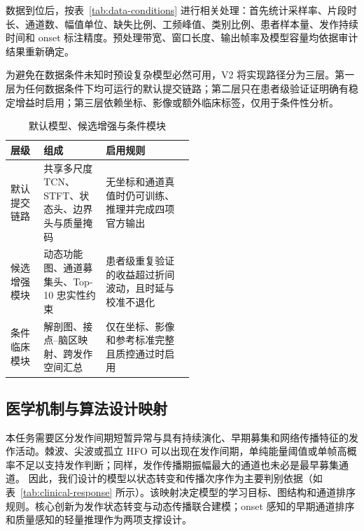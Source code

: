 \documentclass{cumcmthesis_v2}
\numberwithin{figure}{section} %
\numberwithin{table}{section} %
\begin{document}
数据到位后，按表~\ref{tab:data-conditions} 进行相关处理：首先统计采样率、片段时长、通道数、幅值单位、缺失比例、工频峰值、类别比例、患者样本量、发作持续时间和 onset 标注精度。预处理带宽、窗口长度、输出帧率及模型容量均依据审计结果重新确定。

为避免在数据条件未知时预设复杂模型必然可用，V2 将实现路径分为三层。第一层为任何数据条件下均可运行的默认提交链路；第二层只在患者级验证证明确有稳定增益时启用；第三层依赖坐标、影像或额外临床标签，仅用于条件性分析。

\begin{table}[htbp]
    \centering
    \small
    \caption{默认模型、候选增强与条件模块}
    \label{tab:model-levels}
    \renewcommand{\arraystretch}{1.25}
    \setlength{\tabcolsep}{4pt}
    \begin{tabularx}{\linewidth}{@{}p{0.18\linewidth}p{0.34\linewidth}X@{}}
        \toprule
        \textbf{层级} & \textbf{组成} & \textbf{启用规则} \\
        \midrule
        默认提交链路 & 共享多尺度 TCN、STFT、状态头、边界头与质量掩码 & 无坐标和通道真值时仍可训练、推理并完成四项官方输出 \\
        候选增强模块 & 动态功能图、通道募集头、Top-10 忠实性约束 & 患者级重复验证的收益超过折间波动，且时延与校准不退化 \\
        条件临床模块 & 解剖图、接点--脑区映射、跨发作空间汇总 & 仅在坐标、影像和参考标准完整且质控通过时启用 \\
        \bottomrule
    \end{tabularx}
\end{table}


\subsection{医学机制与算法设计映射}

本任务需要区分发作间期短暂异常与具有持续演化、早期募集和网络传播特征的发作活动。棘波、尖波或孤立 HFO 可以出现在发作间期，单纯能量阈值或单帧高概率不足以支持发作判断；同样，发作传播期振幅最大的通道也未必是最早募集通道。
因此，我们设计的模型以状态转变和传播次序作为主要判别依据（如表~\ref{tab:clinical-response} 所示）。该映射决定模型的学习目标、图结构和通道排序规则。核心创新为发作状态转变与动态传播联合建模；onset 感知的早期通道排序和质量感知的轻量推理作为两项支撑设计。
\end{document}
